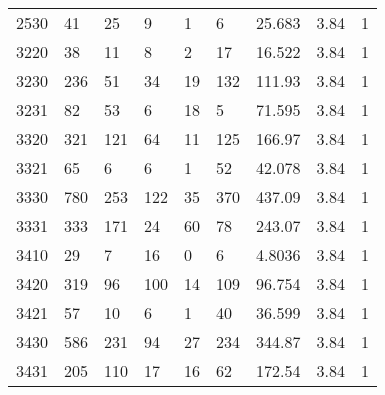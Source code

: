 \begin{longtable}{lllllllll}
2530 & 41            & 25               & 9                  & 1                & 6                  & \cellcolor[HTML]{9AFF99}25.683 & 3.84 & \cellcolor[HTML]{FFCC67}1 \\
3220 & 38            & 11               & 8                  & 2                & 17                 & \cellcolor[HTML]{9AFF99}16.522 & 3.84 & \cellcolor[HTML]{FFCC67}1 \\
3230 & 236           & 51               & 34                 & 19               & 132                & \cellcolor[HTML]{9AFF99}111.93 & 3.84 & \cellcolor[HTML]{FFCC67}1 \\
3231 & 82            & 53               & 6                  & 18               & 5                  & \cellcolor[HTML]{9AFF99}71.595 & 3.84 & \cellcolor[HTML]{FFCC67}1 \\
3320 & 321           & 121              & 64                 & 11               & 125                & \cellcolor[HTML]{9AFF99}166.97 & 3.84 & \cellcolor[HTML]{FFCC67}1 \\
3321 & 65            & 6                & 6                  & 1                & 52                 & \cellcolor[HTML]{9AFF99}42.078 & 3.84 & \cellcolor[HTML]{FFCC67}1 \\
3330 & 780           & 253              & 122                & 35               & 370                & \cellcolor[HTML]{9AFF99}437.09 & 3.84 & \cellcolor[HTML]{FFCC67}1 \\
3331 & 333           & 171              & 24                 & 60               & 78                 & \cellcolor[HTML]{9AFF99}243.07 & 3.84 & \cellcolor[HTML]{FFCC67}1 \\
3410 & 29            & 7                & 16                 & 0                & 6                  & \cellcolor[HTML]{9AFF99}4.8036 & 3.84 & \cellcolor[HTML]{FFCC67}1 \\
3420 & 319           & 96               & 100                & 14               & 109                & \cellcolor[HTML]{9AFF99}96.754 & 3.84 & \cellcolor[HTML]{FFCC67}1 \\
3421 & 57            & 10               & 6                  & 1                & 40                 & \cellcolor[HTML]{9AFF99}36.599 & 3.84 & \cellcolor[HTML]{FFCC67}1 \\
3430 & 586           & 231              & 94                 & 27               & 234                & \cellcolor[HTML]{9AFF99}344.87 & 3.84 & \cellcolor[HTML]{FFCC67}1 \\
3431 & 205           & 110              & 17                 & 16               & 62                 & \cellcolor[HTML]{9AFF99}172.54 & 3.84 & \cellcolor[HTML]{FFCC67}1 \\

\end{longtable}
